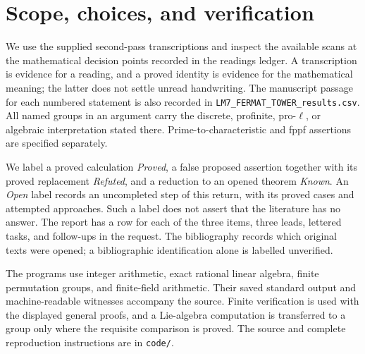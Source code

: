 \documentclass[11pt,a4paper]{article}
\begin{document}
\newpage
\tableofcontents

\section{Scope, choices, and verification}
We use the supplied second-pass transcriptions and inspect the available
scans at the mathematical decision points recorded in the readings ledger.
A transcription is evidence for a reading, and a proved identity is evidence
for the mathematical meaning; the latter does not settle unread handwriting.
The manuscript passage for each numbered statement is also recorded in
\texttt{LM7\_FERMAT\_TOWER\_results.csv}. All named groups in an argument
carry the discrete, profinite, pro-$\ell$, or algebraic interpretation stated
there. Prime-to-characteristic and fppf assertions are specified separately.

We label a proved calculation \emph{Proved}, a false proposed assertion
together with its proved replacement \emph{Refuted}, and a reduction to an
opened theorem \emph{Known}. An \emph{Open} label records an uncompleted step
of this return, with its proved cases and attempted approaches. Such a label
does not assert that the literature has no answer. The report has a row for
each of the three items, three leads, lettered tasks, and follow-ups in the
request. The bibliography records which original texts were opened; a
bibliographic identification alone is labelled unverified.

The programs use integer arithmetic, exact rational linear algebra, finite
permutation groups, and finite-field arithmetic. Their saved standard output
and machine-readable witnesses accompany the source. Finite verification is
used with the displayed general proofs, and a Lie-algebra computation is
transferred to a group only where the requisite comparison is proved.
The source and complete reproduction instructions are in \texttt{code/}.
\end{document}
